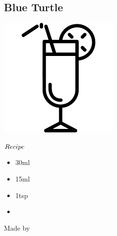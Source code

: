 \subsection{Blue Turtle}
\vspace{-7.4mm}
\hspace{36mm}
\includegraphics[scale=.07]{cocktail_glass_tall.png}
\begin{itembox}[l]{\boldmath $Recipe$}
\begin{itemize}
\setlength{\parskip}{0cm}
\setlength{\itemsep}{0cm}
\item \vodka 30ml
\item \lj 15ml
\item \bc 1tsp
\item \tw 
\end{itemize}
\vspace{-4mm}
Made by \build
\end{itembox}
